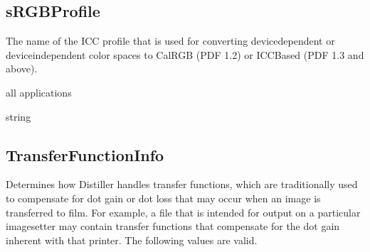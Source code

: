 \documentclass[letterpaper,12pt,english,openany,oneside]{sphinxmanual}
\begin{document}
\begin{sphinxVerbatim}[commandchars=\\\{\}]
\end{sphinxVerbatim}




\subsection{sRGBProfile}
\label{\detokenize{PDF_Create_CommonSettings:srgbprofile}}
 The name of the ICC profile that is used for converting device\sphinxhyphen{}dependent or device\sphinxhyphen{}independent color spaces to CalRGB (PDF 1.2) or ICCBased (PDF 1.3 and above).

\label{\detokenize{PDF_Create_CommonSettings:supported-by-83}}

all applications

\label{\detokenize{PDF_Create_CommonSettings:type-82}}

string

\label{\detokenize{PDF_Create_CommonSettings:default-value-77}}

\begin{sphinxVerbatim}[commandchars=\\\{\}]
 
\end{sphinxVerbatim}




\subsection{TransferFunctionInfo}
\label{\detokenize{PDF_Create_CommonSettings:transferfunctioninfo}}
Determines how Distiller handles transfer functions, which are traditionally used to compensate for dot gain or dot loss that may occur when an image is transferred to film. For example, a file that is intended for output on a particular imagesetter may contain transfer functions that compensate for the dot gain inherent with that printer. The following values are valid.
\end{document}
